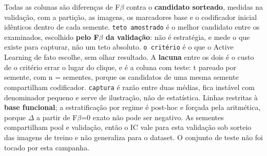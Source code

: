 \footnotesize Todas as colunas são diferenças de F$\beta$ contra o \textbf{candidato sorteado}, medidas na validação, com a partição, as imagens, os marcadores base e o codificador inicial idênticos dentro de cada semente. \texttt{teto amostrado} é o melhor candidato entre os examinados, escolhido \textbf{pelo F$\beta$ da validação}: não é estratégia, e mede o que existe para capturar, não um teto absoluto. \texttt{o critério} é o que o Active Learning de fato escolhe, sem olhar resultado. A \textbf{lacuna} entre os dois é o custo de o critério errar o lugar do clique, e é a coluna com teste: t pareado por semente, com n = sementes, porque os candidatos de uma mesma semente compartilham codificador. \texttt{captura} é razão entre duas médias, fica instável com denominador pequeno e serve de ilustração, não de estatística. Linhas restritas à \textbf{base funcional}; a estratificação por regime é post-hoc e forçada pela aritmética, porque $\Delta$ a partir de F$\beta$=0 exato não pode ser negativo. As sementes compartilham pool e validação, então o IC vale para esta validação sob sorteio das imagens de treino e não generaliza para o dataset. O conjunto de teste não foi tocado por esta campanha.
\normalsize
